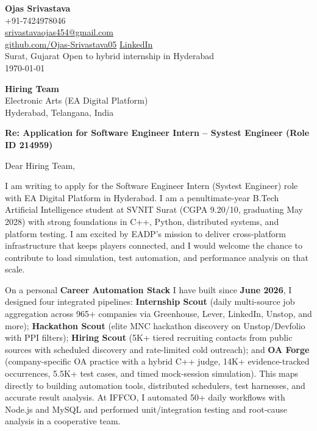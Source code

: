 \documentclass[a4paper,11pt]{article}
\begin{document}
\begin{flushright}
\textbf{Ojas Srivastava} \\
+91-7424978046 \\
\href{mailto:srivastavaojas454@gmail.com}{srivastavaojas454@gmail.com} \\
\href{https://github.com/Ojas-Srivastava05}{github.com/Ojas-Srivastava05} \textbar{}
\href{https://linkedin.com/in/ojas-srivastava05}{LinkedIn} \\
Surat, Gujarat \textbar{} Open to hybrid internship in Hyderabad \\
\today
\end{flushright}

\vspace{4mm}
\textbf{Hiring Team} \\
Electronic Arts (EA Digital Platform) \\
Hyderabad, Telangana, India

\vspace{2mm}
\textbf{Re: Application for Software Engineer Intern -- Systest Engineer (Role ID 214959)}

Dear Hiring Team,

I am writing to apply for the Software Engineer Intern (Systest Engineer) role with EA Digital Platform in Hyderabad. I am a penultimate-year B.Tech Artificial Intelligence student at SVNIT Surat (CGPA 9.20/10, graduating May 2028) with strong foundations in C++, Python, distributed systems, and platform testing. I am excited by EADP's mission to deliver cross-platform infrastructure that keeps players connected, and I would welcome the chance to contribute to load simulation, test automation, and performance analysis on that scale.

On a personal \textbf{Career Automation Stack} I have built since \textbf{June 2026}, I designed four integrated pipelines: \textbf{Internship Scout} (daily multi-source job aggregation across 965+ companies via Greenhouse, Lever, LinkedIn, Unstop, and more); \textbf{Hackathon Scout} (elite MNC hackathon discovery on Unstop/Devfolio with PPI filters); \textbf{Hiring Scout} (5K+ tiered recruiting contacts from public sources with scheduled discovery and rate-limited cold outreach); and \textbf{OA Forge} (company-specific OA practice with a hybrid C++ judge, 14K+ evidence-tracked occurrences, 5.5K+ test cases, and timed mock-session simulation). This maps directly to building automation tools, distributed schedulers, test harnesses, and accurate result analysis. At IFFCO, I automated 50+ daily workflows with Node.js and MySQL and performed unit/integration testing and root-cause analysis in a cooperative team.
\end{document}
